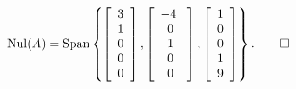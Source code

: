 \begin{Exam}
\[\nul(A) = \Span\left\{\vr{3\\1\\0\\0\\0}, \mtx{c}{-4\ \\0\\1\\0\\0}, \vr{1\\0\\0\\1\\9}\right\}. \qedhere\]
\end{Exam}\vs

%
%
%
